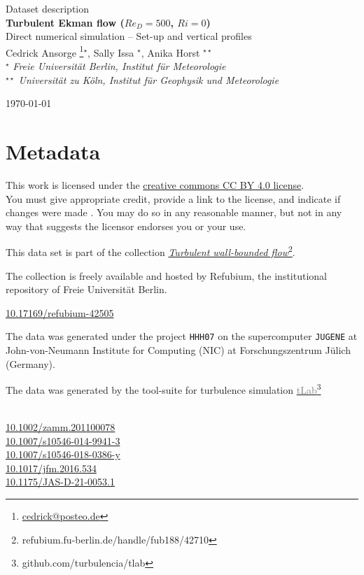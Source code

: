 \documentclass[11pt]{article}
\date{\nodate}
\makeatletter
\newcommand{\dstitle}{Turbulent Ekman flow ($Re_D=500$, $Ri=0$)}
\newcommand{\subtitle}{Direct numerical simulation -- Set-up and vertical profiles}
\newcommand{\doi}{10.17169/refubium-42505}
\newcommand{\tlabName}{\textcolor{gray}{tLab}}
\newcommand{\authors}{
    Cedrick Ansorge \footnote{\href{mailto:cedrick@posteo.de}{cedrick@posteo.de}}$^\star$, \hspace{0.05cm}  
    Sally Issa $^\star$\hspace{0.05cm},
    Anika Horst $^{\star\star}$ \\[0.5em]
    {\small \light{$^\star$ \emph{ Freie Universit\"at Berlin, Institut f\"ur Meteorologie} \\
    $^{\star\star}$ \emph{Universit\"at zu K\"oln, Institut f\"ur Geophysik und Meteorologie}}}
}
\newcommand{\light}[1]{\textcolor{black!80}{#1}}
\newcommand{\printdoi}[1]{\href{https://dx.doi.org/#1}{#1}}
\makeatother
\begin{document}
{ \selectfont
\begin{centering}

 \light{\large Dataset description} \\[1em] 
 {\LARGE \bfseries \sffamily\dstitle} \\[1em]
 \light{\large\subtitle} \\[1em]
 \authors\\ 
\end{centering}
\light{\hfill \today}
}


\section{Metadata}
\begin{description}
\sffamily
\item[\textcopyright] This work is licensed under the \href{https://creativecommons.org/licenses/by/4.0}{creative commons CC BY 4.0 license}. \\ {\small\light{You must give appropriate credit, provide a link to the license, and indicate if changes were made . You may do so in any reasonable manner, but not in any way that suggests the licensor endorses you or your use. }}
\item[\sffamily Collection] This data set is part of the collection \href{https://refubium.fu-berlin.de/handle/fub188/42710}{\emph{Turbulent wall-bounded flow}\footnote{\url{refubium.fu-berlin.de/handle/fub188/42710}}}.

{\small \light{The collection is freely available and hosted by Refubium, the  institutional repository of Freie Universit\"at Berlin.}}

\item[\sffamily DOI]\printdoi{\doi}
\item[\sffamily HPC systems] The data was generated under the project \texttt{HHH07} on the supercomputer \texttt{JUGENE} at John-von-Neumann Institute for Computing (NIC) at Forschungszentrum J\"ulich (Germany). 
\item[\sffamily Code] The data was generated by the tool-suite for turbulence simulation \href{https://github.com/turbulencia/tlab}{\tlabName\footnote{\url{github.com/turbulencia/tlab}}}

\item[\sffamily Related Publications] ~\\
    \printdoi{10.1002/zamm.201100078} \\
    \printdoi{10.1007/s10546-014-9941-3} \\
    \printdoi{10.1007/s10546-018-0386-y} \\
    \printdoi{10.1017/jfm.2016.534} \\
    \printdoi{10.1175/JAS-D-21-0053.1}\\

\end{description}
\end{document}
